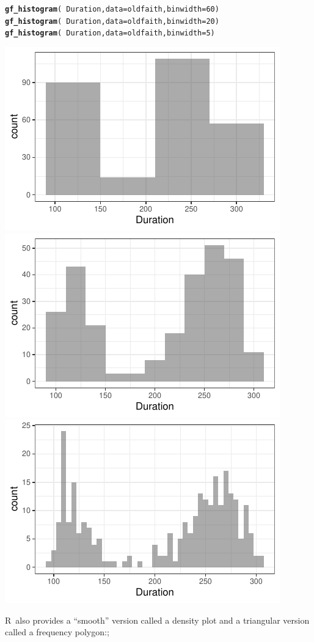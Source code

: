 \documentclass[twoside]{book}\usepackage[]{graphicx}\usepackage[]{xcolor}
\makeatletter
\newcommand{\hlnum}[1]{\textcolor[rgb]{0.686,0.059,0.569}{#1}}%
\newcommand{\hlopt}[1]{\textcolor[rgb]{0,0,0}{#1}}%
\newcommand{\hlstd}[1]{\textcolor[rgb]{0.345,0.345,0.345}{#1}}%
\newcommand{\hlkwc}[1]{\textcolor[rgb]{0.333,0.667,0.333}{#1}}%
\newcommand{\hlkwd}[1]{\textcolor[rgb]{0.737,0.353,0.396}{\textbf{#1}}}%
\newenvironment{kframe}{%
 \def\at@end@of@kframe{}%
 \ifinner\ifhmode%
  \def\at@end@of@kframe{\end{minipage}}%
  \begin{minipage}{\columnwidth}%
 \fi\fi%
 \def\FrameCommand##1{\hskip\@totalleftmargin \hskip-\fboxsep
 \colorbox{shadecolor}{##1}\hskip-\fboxsep
     \hskip-\linewidth \hskip-\@totalleftmargin \hskip\columnwidth}%
 \MakeFramed {\advance\hsize-\width
   \@totalleftmargin\z@ \linewidth\hsize
   \@setminipage}}%
 {\par\unskip\endMakeFramed%
 \at@end@of@kframe}
\newenvironment{knitrout}{}{} %
\def\R{{\sf R}}
\makeatother
\begin{document}
\begin{knitrout}
\color{fgcolor}\begin{kframe}
\begin{alltt}
\hlkwd{gf_histogram}\hlstd{(} \hlopt{~} \hlstd{Duration,} \hlkwc{data} \hlstd{= oldfaith,} \hlkwc{binwidth} \hlstd{=} \hlnum{60} \hlstd{)}
\hlkwd{gf_histogram}\hlstd{(} \hlopt{~} \hlstd{Duration,} \hlkwc{data} \hlstd{= oldfaith,} \hlkwc{binwidth} \hlstd{=} \hlnum{20} \hlstd{)}
\hlkwd{gf_histogram}\hlstd{(} \hlopt{~} \hlstd{Duration,} \hlkwc{data} \hlstd{= oldfaith,} \hlkwc{binwidth} \hlstd{=} \hlnum{5} \hlstd{)}
\end{alltt}
\end{kframe}

{\centering \includegraphics[width=.3\textwidth]{figures/fig-binwidth-1} 
\includegraphics[width=.3\textwidth]{figures/fig-binwidth-2} 
\includegraphics[width=.3\textwidth]{figures/fig-binwidth-3} 

}



\end{knitrout}

\R\ also provides a ``smooth'' version called a density plot and a triangular version
called a frequency polygon:; 
\end{document}
